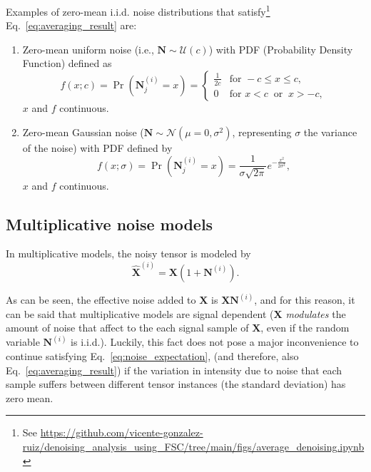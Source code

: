 \documentclass{article}
\begin{document}
Examples of zero-mean i.i.d. noise distributions that
satisfy\footnote{See
  \url{https://github.com/vicente-gonzalez-ruiz/denoising_analysis_using_FSC/tree/main/figs/average_denoising.ipynb}}
Eq.~\ref{eq:averaging_result} are:
\begin{enumerate}
\item Zero-mean uniform noise (i.e., ${\mathbf N}\sim{\mathcal U}(c)$) with
  PDF (Probability Density Function) defined as
  \begin{equation}
    f(x; c) = \Pr({\mathbf N}^{(i)}_j{=}x) = \begin{cases}
      \frac{1}{2c} & \text{for } -c \le x \le c, \\[8pt]
      0 & \text{for } x < c \ \text{ or } \ x > -c,
    \end{cases}
  \end{equation}
  $x$ and $f$ continuous.
\item Zero-mean Gaussian noise
  (${\mathbf N}\sim{\mathcal N}(\mu=0,\sigma^2)$, representing
  $\sigma$ the variance of the noise) with PDF defined by
  \begin{equation}
    f(x; \sigma) = \Pr({\mathbf N}^{(i)}_j{=}x) = \frac 1 {\sigma\sqrt{2\pi}} e^{-\frac{x^2}{2\sigma^2} },
  \end{equation}
  $x$ and $f$ continuous.
\end{enumerate}

\subsection{Multiplicative noise models}
In multiplicative models, the noisy tensor is modeled by
\begin{equation}
  \hat{\mathbf X}^{(i)} = {\mathbf X} (1 + {\mathbf N}^{(i)}).
  \label{eq:multiplicative_noisy_model}
\end{equation}

As can be seen, the effective noise added to ${\mathbf X}$ is
${\mathbf X}{\mathbf N}^{(i)}$, and for this reason, it can be said
that multiplicative models are signal dependent (${\mathbf X}$
\emph{modulates} the amount of noise that affect to the each signal
sample of ${\mathbf X}$, even if the random variable
${\mathbf N}^{(i)}$ is i.i.d.). Luckily, this fact does not pose a
major inconvenience to continue satisfying
Eq.~\ref{eq:noise_expectation}, (and therefore, also
Eq.~\ref{eq:averaging_result}) if the variation in intensity due to
noise that each sample suffers between different tensor instances (the
standard deviation) has zero mean.
\end{document}
